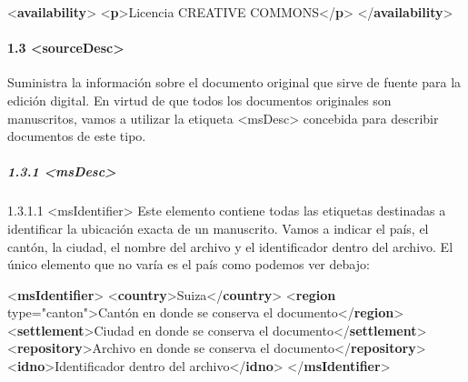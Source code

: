 \documentclass[
]{book}
\newenvironment{Shaded}{\begin{snugshade}}{\end{snugshade}}
\newcommand{\KeywordTok}[1]{\textcolor[rgb]{0.13,0.29,0.53}{\textbf{#1}}}
\newcommand{\NormalTok}[1]{#1}
\newcommand{\OtherTok}[1]{\textcolor[rgb]{0.56,0.35,0.01}{#1}}
\newcommand{\StringTok}[1]{\textcolor[rgb]{0.31,0.60,0.02}{#1}}
\begin{document}
\begin{Shaded}
\begin{Highlighting}[]
\NormalTok{\textless{}}\KeywordTok{availability}\NormalTok{\textgreater{}}
\NormalTok{    \textless{}}\KeywordTok{p}\NormalTok{\textgreater{}Licencia CREATIVE COMMONS\textless{}/}\KeywordTok{p}\NormalTok{\textgreater{}}
\NormalTok{\textless{}/}\KeywordTok{availability}\NormalTok{\textgreater{} }
\end{Highlighting}
\end{Shaded}

\hypertarget{sourcedesc}{%
\paragraph*{\texorpdfstring{1.3 { \textless sourceDesc\textgreater{} }}{1.3  \textless sourceDesc\textgreater{} }}\label{sourcedesc}}

Suministra la información sobre el documento original que sirve de fuente para la edición digital.
En virtud de que todos los documentos originales son manuscritos, vamos a utilizar la etiqueta { \textless msDesc\textgreater{}} concebida para describir documentos de este tipo.

\hypertarget{msdesc}{%
\subparagraph*{\texorpdfstring{1.3.1 { \textless msDesc\textgreater{} }}{1.3.1  \textless msDesc\textgreater{} }}\label{msdesc}}

{1.3.1.1 } { \textless msIdentifier\textgreater{} }
Este elemento contiene todas las etiquetas destinadas a identificar la ubicación exacta de un manuscrito. Vamos a indicar el país, el cantón, la ciudad, el nombre del archivo y el identificador dentro del archivo. El único elemento que no varía es el país como podemos ver debajo:

\begin{Shaded}
\begin{Highlighting}[]
\NormalTok{\textless{}}\KeywordTok{msIdentifier}\NormalTok{\textgreater{}}
\NormalTok{    \textless{}}\KeywordTok{country}\NormalTok{\textgreater{}Suiza\textless{}/}\KeywordTok{country}\NormalTok{\textgreater{}}
\NormalTok{    \textless{}}\KeywordTok{region}\OtherTok{ type=}\StringTok{"canton"}\NormalTok{\textgreater{}Cantón en donde se conserva el documento\textless{}/}\KeywordTok{region}\NormalTok{\textgreater{} }
\NormalTok{    \textless{}}\KeywordTok{settlement}\NormalTok{\textgreater{}Ciudad en donde se conserva el documento\textless{}/}\KeywordTok{settlement}\NormalTok{\textgreater{} }
\NormalTok{    \textless{}}\KeywordTok{repository}\NormalTok{\textgreater{}Archivo en donde se conserva el documento\textless{}/}\KeywordTok{repository}\NormalTok{\textgreater{} }
\NormalTok{    \textless{}}\KeywordTok{idno}\NormalTok{\textgreater{}Identificador dentro del archivo\textless{}/}\KeywordTok{idno}\NormalTok{\textgreater{} }
\NormalTok{\textless{}/}\KeywordTok{msIdentifier}\NormalTok{\textgreater{}}
\end{Highlighting}
\end{Shaded}
\end{document}
